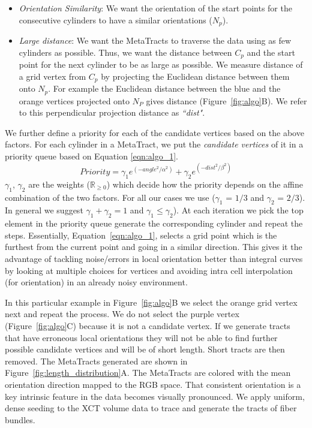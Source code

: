 \begin{itemize}
\item \textit{Orientation Similarity}: We want the orientation of the start points for the consecutive cylinders to have a similar orientations ($N_p$). 
\item \textit{Large distance}: We want the MetaTracts to traverse the data using as few cylinders as possible. Thus, we want the distance between $C_p$ and the start point for the next cylinder to be as large as possible. We measure distance of a grid vertex from $C_p$ by projecting the Euclidean distance between them onto $N_p$. For example the Euclidean distance between the blue and the orange vertices projected onto $N_P$ gives distance (Figure~\ref{fig:algo}B). We refer to this perpendicular projection distance as \textit{``dist"}. 
\end{itemize}
We further define a priority for each of the candidate vertices based on the above factors.
For each cylinder in a MetaTract, we put the \textit{candidate vertices} of it in a priority queue based on Equation \ref{eqn:algo_1}.
\begin{equation}
Priority = \gamma_1 e^{(-angle^2 / \alpha^2)} + \gamma_2e^{(-dist^2 / \beta^2)}
\label{eqn:algo_1}
\end{equation}
$\gamma_1$, $\gamma_2$ are the  weights ($\mathbb{R}_{\ge 0}$)  which decide how the priority depends on the affine combination of the two factors. For all our cases we use ($\gamma_1$ = $1 / 3 $ and $\gamma_2$ = $2 / 3$). In general we suggest $\gamma_1 +\gamma_2 = 1 $ and $\gamma_1 \leq \gamma_2$). At each iteration we pick the top element in the priority queue generate the corresponding cylinder and repeat the steps. Essentially, Equation~\ref{eqn:algo_1}, selects a grid point which is the furthest from the current point and going in a similar direction. This gives it the advantage of tackling noise/errors in local orientation better than integral curves by looking at multiple choices for vertices and avoiding intra cell interpolation (for orientation) in an already noisy environment. 
 
In this particular example in Figure~\ref{fig:algo}B we select the orange grid vertex next and repeat the process. We do not select the purple vertex (Figure~\ref{fig:algo}C) because it is not a candidate vertex. If we generate tracts that have erroneous local orientations they will not be able to find further possible candidate vertices and will be of short length. Short tracts are then removed. The MetaTracts generated are shown in Figure~\ref{fig:length_distribution}A. The MetaTracts are colored with the mean orientation direction mapped to the RGB space. That consistent orientation is a key intrinsic feature in the data becomes visually pronounced.
We apply uniform, dense seeding to the XCT volume data to trace and generate the tracts of fiber bundles. 
 

